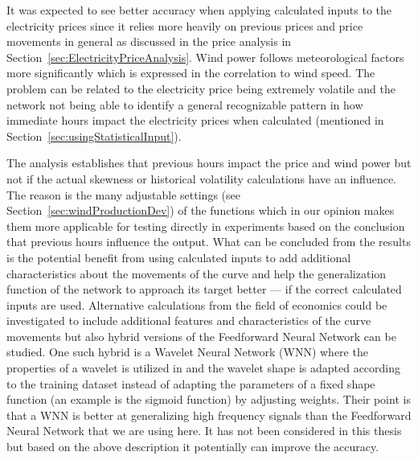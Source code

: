 It was expected to see better accuracy when applying calculated inputs to the electricity prices since it relies more heavily on previous prices and price movements in general as discussed in the price analysis in Section~\ref{sec:ElectricityPriceAnalysis}. Wind power follows meteorological factors more significantly which is expressed in the correlation to wind speed. The problem can be related to the electricity price being extremely volatile and the network not being able to identify a general recognizable pattern in how immediate hours impact the electricity prices when calculated (mentioned in Section~\ref{sec:usingStatisticalInput}).

The analysis establishes that previous hours impact the price and wind power but not if the actual skewness or historical volatility calculations have an influence. The reason is the many adjustable settings (see Section~\ref{sec:windProductionDev}) of the functions which in our opinion makes them more applicable for testing directly in experiments based on the conclusion that previous hours influence the output. What can be concluded from the results is the potential benefit from using calculated inputs to add additional characteristics about the movements of the curve and help the generalization function of the network to approach its target better --- if the correct calculated inputs are used. Alternative calculations from the field of economics could be investigated to include additional features and characteristics of the curve movements but also hybrid versions of the Feedforward Neural Network can be studied. One such hybrid is a Wavelet Neural Network (WNN) where the properties of a wavelet is utilized in \cite{adaptiveWaveletANNElectricityMarkets} and the wavelet shape is adapted according to the training dataset instead of adapting the parameters of a fixed shape function (an example is the sigmoid function) by adjusting weights. Their point is that a WNN is better at generalizing high frequency signals than the Feedforward Neural Network that we are using here. It has not been considered in this thesis but based on the above description it potentially can improve the accuracy.
